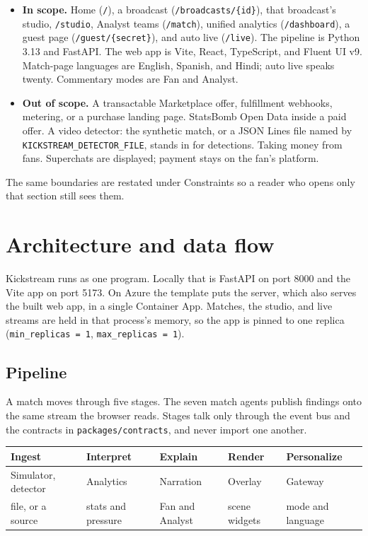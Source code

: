 \documentclass[11pt]{article}
\begin{document}
\begin{itemize}
  \item \textbf{In scope.}
    Home (\texttt{/}), a broadcast (\texttt{/broadcasts/\{id\}}), that broadcast's studio,
    \texttt{/studio}, Analyst teams (\texttt{/match}), unified analytics (\texttt{/dashboard}),
    a guest page (\texttt{/guest/\{secret\}}), and auto live (\texttt{/live}).
    The pipeline is Python 3.13 and FastAPI.
    The web app is Vite, React, TypeScript, and Fluent UI v9.
    Match-page languages are English, Spanish, and Hindi; auto live speaks twenty.
    Commentary modes are Fan and Analyst.
  \item \textbf{Out of scope.}
    A transactable Marketplace offer, fulfillment webhooks, metering, or a purchase landing page.
    StatsBomb Open Data inside a paid offer.
    A video detector: the synthetic match, or a JSON Lines file named by
    \texttt{KICKSTREAM\_DETECTOR\_FILE}, stands in for detections.
    Taking money from fans. Superchats are displayed; payment stays on the fan's platform.
\end{itemize}

The same boundaries are restated under Constraints so a reader who opens only that
section still sees them.

\section{Architecture and data flow}

Kickstream runs as one program.
Locally that is FastAPI on port 8000 and the Vite app on port 5173.
On Azure the template puts the server, which also serves the built web app, in a
single Container App.
Matches, the studio, and live streams are held in that process's memory, so the
app is pinned to one replica (\texttt{min\_replicas = 1}, \texttt{max\_replicas = 1}).

\subsection{Pipeline}

A match moves through five stages. The seven match agents publish findings onto
the same stream the browser reads. Stages talk only through the event bus and the
contracts in \texttt{packages/contracts}, and never import one another.

\begin{center}
\small
\begin{tabular}{@{}lllll@{}}
\toprule
Ingest & Interpret & Explain & Render & Personalize \\
\midrule
Simulator, detector & Analytics & Narration & Overlay & Gateway \\
file, or a source & stats and pressure & Fan and Analyst & scene widgets & mode and language \\
\bottomrule
\end{tabular}
\end{center}
\end{document}
